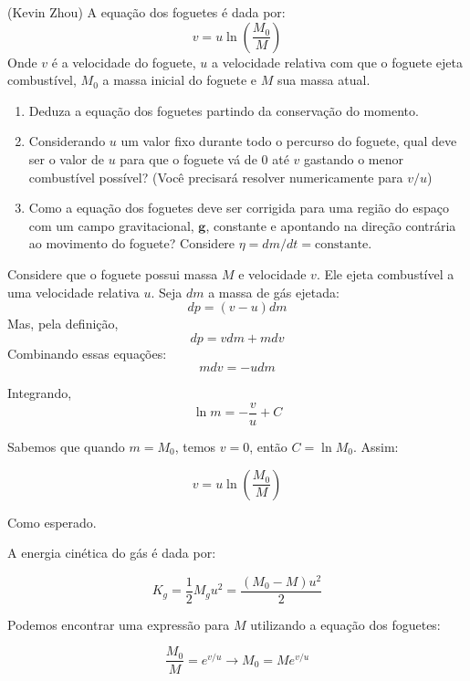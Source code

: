\documentclass[11pt]{article}
\begin{document}
\begin{pproblem} (Kevin Zhou) A equação dos foguetes é dada por:
    \[
    v = u\ln\left(\frac{M_0}{M}\right)
    \]
    Onde \(v\) é a velocidade do foguete, \(u\) a velocidade relativa com que o foguete ejeta combustível, \(M_0\) a massa inicial do foguete e \(M\) sua massa atual.
    \begin{enumerate}[label=\textbf{\alph*)}]
        \item Deduza a equação dos foguetes partindo da conservação do momento.
        \item Considerando \(u\) um valor fixo durante todo o percurso do foguete, qual deve ser o valor de \(u\) para que o foguete vá de \(0\) até \(v\) gastando o menor combustível possível? (Você precisará resolver numericamente para \(v/u\))
        \item Como a equação dos foguetes deve ser corrigida para uma região do espaço com um campo gravitacional, \(\mathbf{g}\), constante e apontando na direção contrária ao movimento do foguete? Considere \(\eta = dm/dt = \text{constante}\).
    \end{enumerate}

    \begin{pssolution*}{}{}
        \begin{alternativas}
            \item Considere que o foguete possui massa \(M\) e velocidade \(v\). Ele ejeta combustível a uma velocidade relativa \(u\). Seja \(dm\) a massa de gás ejetada:
            \[dp = (v-u)dm\]
            Mas, pela definição,
            \[dp = vdm + mdv\]
            Combinando essas equações:
            \[mdv = -udm\]

            Integrando,
            \[\ln m = -\frac{v}{u} + C\]

            Sabemos que quando \(m = M_0\), temos \(v = 0\), então \(C = \ln M_0\). Assim:

            \[v = u \ln\left(\frac{M_0}{M}\right)\]

            Como esperado.

            \item A energia cinética do gás é dada por:
            
            \[K_{g} =\frac{1}{2}M_gu^2 = \frac{(M_0-M)u^2}{2}\]

            Podemos encontrar uma expressão para \(M\) utilizando a equação dos foguetes:

            \[\frac{M_0}{M} = e^{v/u} \rightarrow M_0 = Me^{v/u}\]


\end{alternativas}
\end{pssolution*}
\end{pproblem}
\end{document}
